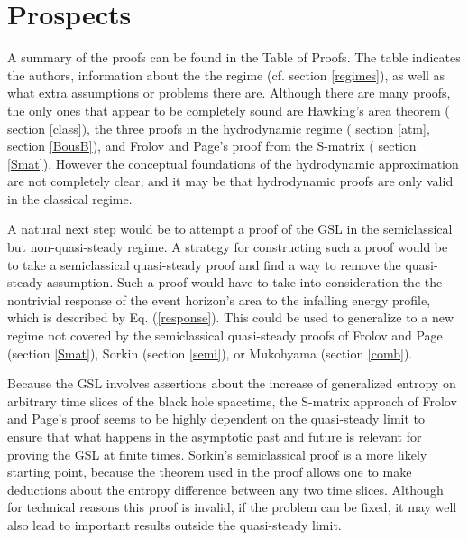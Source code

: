 \documentclass[12pt]{article}
\begin{document}
\section{Prospects}

A summary of the proofs can be found in the Table of Proofs.  The table indicates the authors, information about the the regime (cf. section \ref{regimes}), as well as what extra assumptions or problems there are.  Although there are many proofs, the only ones that appear to be completely sound are Hawking's area theorem (\cite{hawking71} section \ref{class}), the three proofs in the hydrodynamic regime (\cite{wald94} section \ref{atm}, \cite{FMW00}\cite{BFM03} section \ref{BousB}), and Frolov and Page's proof from the S-matrix (\cite{FP93} section \ref{Smat}).  However the conceptual foundations of the hydrodynamic approximation are not completely clear, and it may be that hydrodynamic proofs are only valid in the classical regime.

A natural next step would be to attempt a proof of the GSL in the semiclassical but non-quasi-steady regime.  A strategy for constructing such a proof would be to take a semiclassical quasi-steady proof and find a way to remove the quasi-steady assumption.  Such a proof would have to take into consideration the the nontrivial response of the event horizon's area to the infalling energy profile, which is described by Eq. (\ref{response}).  This could be used to generalize to a new regime not covered by the semiclassical quasi-steady proofs of Frolov and Page \cite{FP93} (section \ref{Smat}), Sorkin \cite{sorkin98} (section \ref{semi}), or Mukohyama \cite{muko97} (section \ref{comb}).

Because the GSL involves assertions about the increase of generalized entropy on arbitrary time slices of the black hole spacetime, the S-matrix approach of Frolov and Page's proof seems to be highly dependent on the quasi-steady limit to ensure that what happens in the asymptotic past and future is relevant for proving the GSL at finite times.  Sorkin's semiclassical proof is a more likely starting point, because the theorem used in the proof allows one to make deductions about the entropy difference between any two time slices.  Although for technical reasons this proof is invalid, if the problem can be fixed, it may well also lead to important results outside the quasi-steady limit.
\end{document}
